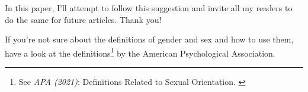 In this paper, I'll attempt to follow this suggestion and invite all my readers to do the same for future articles. Thank you!

If you're not sure about the definitions of gender and sex and how to use them, have a look at the definitions\footnote{See \textit{APA (2021)}: Definitions Related to Sexual Orientation. \cite{apaDefinitions}} by the American Psychological Association.

